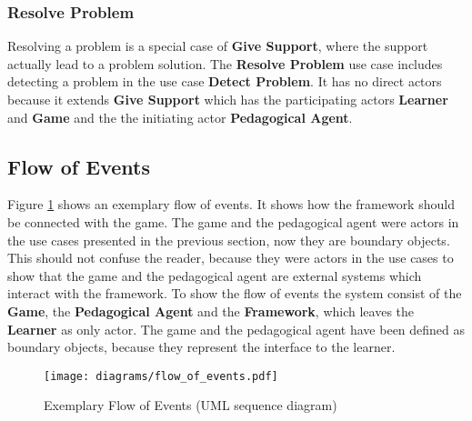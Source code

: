 \subsubsection{Resolve Problem}
Resolving a problem is a special case of \textbf{Give Support}, where the
support actually lead to a problem solution. The \textbf{Resolve Problem} use
case includes detecting a problem in the use case \textbf{Detect Problem}. It has
no direct actors because it extends \textbf{Give Support} which has the
participating actors \textbf{Learner} and \textbf{Game} and the the initiating
actor \textbf{Pedagogical Agent}.


\subsection{Flow of Events}
Figure \ref{flow_of_events} shows an exemplary flow of events. It shows how
the framework should be connected with the game. The game and the pedagogical
agent were actors in the use cases presented in the previous section, now they
are boundary objects. This should not confuse the reader, because they were
actors in the use cases to show that the game and the pedagogical agent are
external systems which interact with the framework. To show the flow of events
the system consist of the \textbf{Game}, the \textbf{Pedagogical Agent} and the \textbf{Framework}, which
leaves the \textbf{Learner} as only actor. The game and the pedagogical agent have been defined
as boundary objects, because they represent the interface to
the learner.

\begin{figure}
    \centering
    \texttt{[image: diagrams/flow\_of\_events.pdf]}
    \caption[Exemplary Flow of Events (UML sequence diagram)]
    {Exemplary Flow of Events (UML sequence diagram)}
    \label{flow_of_events}
\end{figure}

